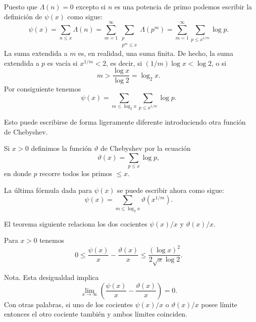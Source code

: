 \documentclass[12pt,a4paper]{book}
\begin{document}
    Puesto que $\Lambda(n)=0$ excepto si $n$ es una potencia de primo podemos escribir
    la definición de $\psi(x)$ como sigue:
    \begin{equation*}
        \psi(x)=\sum_{n\leq x}\Lambda(n)=\sum_{m=1}^{\infty}\sum_{\substack{p\\ p^m\leq x}}\Lambda(p^m)
        =\sum_{m=1}^{\infty}\sum_{p\leq x^{1/m}}\log p.
    \end{equation*}
    La suma extendida a $m$ es, en realidad, una suma finita. De hecho, la suma
    extendida a $p$ es vacía si $x^{1/m}<2$, es decir, si $(1/m)\log x<\log2$, o si
    \begin{equation*}
        m>\frac{\log x}{\log2}=\log_2x.
    \end{equation*}
    Por consiguiente tenemos
    \begin{equation*}
        \psi(x)=\sum_{m\leq\log_2x}\sum_{p\leq x^{1/m}}\log p.
    \end{equation*}

    Esto puede escribirse de forma ligeramente diferente introduciendo otra función
    de Chebyshev.

    \begin{definicion}
        Si $x>0$ definimos la función $\vartheta$ de Chebyshev por la ecuación
        \begin{equation*}
            \vartheta(x)=\sum_{p\leq x}\log p,
        \end{equation*}
        en donde $p$ recorre todos los primos $\leq x$.
    \end{definicion}

    La última fórmula dada para $\psi(x)$ se puede escribir ahora como sigue:
    \begin{equation}
        \psi(x)=\sum_{m\leq\log_2x}\vartheta(x^{1/m}).
    \end{equation}

    El teorema siguiente relaciona los dos cocientes $\psi(x)/x$ y $\vartheta(x)/x$.

    \begin{teorema}
        Para $x>0$ tenemos
        \begin{equation*}
            0\leq\frac{\psi(x)}{x}-\frac{\vartheta(x)}{x}\leq\frac{(\log x)^2}{2\sqrt{x}\log2}.
        \end{equation*}
    \end{teorema}

    Nota. Esta desigualdad implica
    \begin{equation*}
        \lim_{x\to\infty}\left(\frac{\psi(x)}{x}-\frac{\vartheta(x)}{x}\right)=0.
    \end{equation*}
    Con otras palabras, si uno de los cocientes $\psi(x)/x$ o $\vartheta(x)/x$ posee
    límite entonces el otro cociente también y ambos límites coinciden.
\end{document}
